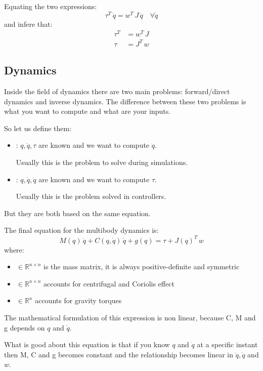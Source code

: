 Equating the two expressions:
\[\tau^T\,\dot{q} = w^T\,J\,\dot{q}\quad\forall\dot{q}\]
 and infere that:
 \begin{align*}
 \tau^T &= w^T\,J\\
 \tau &= J^T\,w
 \end{align*}
 
 \subsection{Dynamics}
 
 Inside the field of dynamics there are two main problems: forward/direct dynamics and inverse dynamics.
 The difference between these two problems is what you want to compute and what are your inputs.
 
 So let us define them:
 \begin{itemize}
 \item {}: $q, \dot{q}, \tau$ are known and we want to compute $\ddot{q}$.
 
 Usually this is the problem to solve during simulations.
 \item {}: $q, \dot{q}, \ddot{q}$ are known and we want to compute $\tau$.
 
 Usually this is the problem solved in controllers.
 \end{itemize}
 
 But they are both based on the same equation.
 
 The final equation for the multibody dynamics is:
 \[M(q)\,\ddot{q} + C(q,\dot{q})\,\dot{q} + g(q) = \tau + J(q)^T\,w\]
 where:
 \begin{itemize}
 \item{$\in \mathbb{R}^{n\times n}$ is the mass matrix, it is always positive-definite and symmetric}
 \item{$\in \mathbb{R}^{n \times n}$ accounts for centrifugal and Coriolis effect}
 \item{$\in \mathbb{R}^{n}$ accounts for gravity torques}
 \end{itemize}
 
 The mathematical formulation of this expression is non linear, because C, M and g depends on $q$ and $\dot{q}$.
 
 What is good about this equation is that if you know $q$ and $\dot{q}$ at a specific instant then M, C and g becomes constant and the relationship becomes linear in $\ddot{q}, \dot{q}$ and $w$.
 
